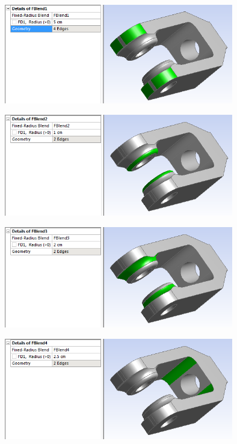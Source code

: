 \documentclass[a4paper,14pt]{extarticle}
\begin{document}
\begin{center}\includegraphics[width=0.75\textwidth]{NX/FI1.PNG}\end{center}

\begin{center}\includegraphics[width=0.75\textwidth]{NX/FI2.PNG}\end{center}

\begin{center}\includegraphics[width=0.75\textwidth]{NX/FI3.PNG}\end{center}

\begin{center}\includegraphics[width=0.75\textwidth]{NX/FI4.PNG}\end{center}
\end{document}
